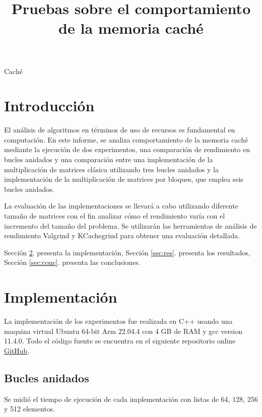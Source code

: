\documentclass[conference]{IEEEtran}
\begin{document}
\title{Pruebas sobre el comportamiento de la memoria caché}


\author{
}

\maketitle

\begin{IEEEkeywords}
  Caché
\end{IEEEkeywords}

\section{Introducción}\label{sec:intro}
El análisis de algoritmos en términos de uso de recursos es fundamental en computación. En este informe, se analiza comportamiento de la memoria caché mediante la ejecución de dos experimentos, una comparación de rendimiento en bucles anidados y una comparación entre una implementación de la multiplicación de matrices clásica utilizando tres bucles anidados y la implementación de la multiplicación de matrices por bloques, que emplea seis bucles anidados.

La evaluación de las implementaciones se llevará a cabo utilizando diferente tamaño de matrices con el fin analizar cómo el rendimiento varía con el incremento del tamaño del problema. Se utilizarán las herramientas de análisis de rendimiento Valgrind y KCachegrind para obtener una evaluación detallada.

Sección \ref{sec:meto}. presenta la implementación, 
Sección \ref{sec:res}. presenta los resultados, 
Sección \ref{sec:conc}. presenta las conclusiones. 

\section{Implementación}\label{sec:meto}
La implementación de los experimentos fue realizada en C++ usando una maquina virtual Ubuntu 64-bit Arm 22.04.4 con 4 GB de RAM y gcc version 11.4.0. Todo el código fuente se encuentra en el siguiente repositorio online \href{https://github.com/fernandoramirez1337/cache_test/tree/main}{GitHub}.
\subsection{Bucles anidados}
Se midió el tiempo de ejecución de cada implementación con listas de 64, 128, 256 y 512 elementos.
\end{document}
